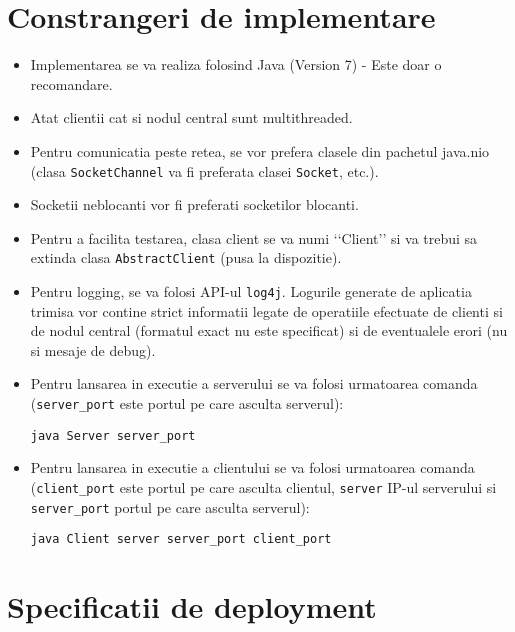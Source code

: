 \documentclass[a4paper]{article}
\begin{document}
\section{Constrangeri de implementare}
\label{sec4}

\begin{itemize}[noitemsep]
	\item Implementarea se va realiza folosind Java (Version 7) - Este doar o recomandare.
	\item Atat clientii cat si nodul central sunt multithreaded.
	\item Pentru comunicatia peste retea, se vor prefera clasele din pachetul java.nio (clasa \texttt{SocketChannel} va fi preferata clasei \texttt{Socket}, etc.).
	\item Socketii neblocanti vor fi preferati socketilor blocanti.
	\item Pentru a facilita testarea, clasa client se va numi \lq\lq{}Client\rq\rq{} si va trebui sa extinda clasa \texttt{AbstractClient} (pusa la dispozitie).
	\item Pentru logging, se va folosi API-ul \texttt{log4j}. Logurile generate de aplicatia trimisa vor contine strict informatii legate de operatiile efectuate de clienti si de nodul central (formatul exact nu este specificat) si de eventualele erori (nu si mesaje de debug).
	\item Pentru lansarea in executie a serverului se va folosi urmatoarea comanda (\texttt{server\_port} este portul pe care asculta serverul):

\begin{verbatim}
java Server server_port
\end{verbatim}

	\item Pentru lansarea in executie a clientului se va folosi urmatoarea comanda (\texttt{client\_port} este portul pe care asculta clientul, \texttt{server} IP-ul serverului si \texttt{server\_port} portul pe care asculta serverul):

\begin{verbatim}	
java Client server server_port client_port
\end{verbatim}

\end{itemize}

\section{Specificatii de deployment}
\label{sec5}
\end{document}
